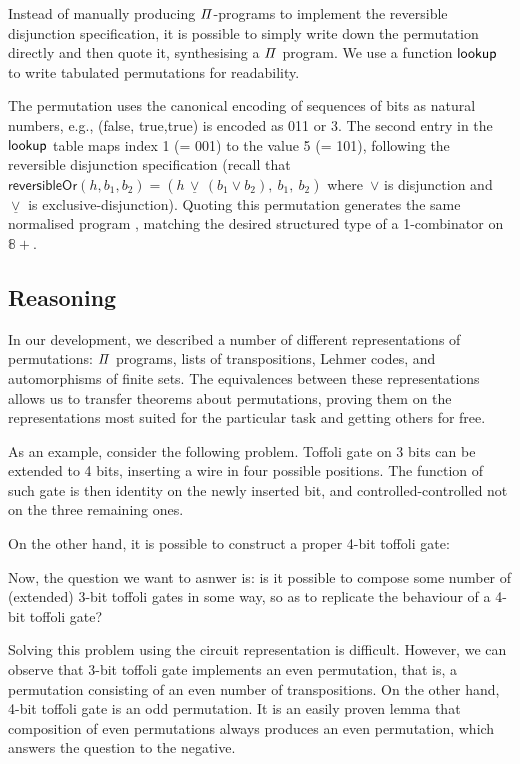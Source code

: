 Instead of manually producing $\mathit{\Pi}$-programs to implement the reversible disjunction specification, it is possible
to simply write down the permutation directly and then quote it, synthesising a $\mathit{\Pi}$ program. We use a function
$\operatorname{\mathsf{lookup}}$ to write tabulated permutations for readability.

\medskip
\resetperm{}

\noindent
The permutation uses the canonical encoding of sequences of bits as natural numbers, e.g., {(\textsf{false},
\textsf{true},\textsf{true})} is encoded as 011 or 3. The second entry in the $\operatorname{\mathsf{lookup}}$ table maps index 1 (= 001)
to the value 5 (= 101), following the reversible disjunction specification (recall that
$\mathsf{reversibleOr}(h,b_1,b_2) = (h \,\underline{\vee}\, (b_1 \vee b_2), ~b_1, ~b_2)$ where~$\vee$ is disjunction
and~$\underline{\vee}$ is exclusive-disjunction). Quoting this permutation generates the same normalised program
, matching the desired structured type of a 1-combinator on $\mathbb{8}+$.

\subsection{Reasoning}

In our development, we described a number of different representations of permutations: $\mathit{\Pi}$ programs, lists of
transpositions, Lehmer codes, and automorphisms of finite sets. The equivalences between these representations allows us
to transfer theorems about permutations, proving them on the representations most suited for the particular task and
getting others for free.

As an example, consider the following problem. Toffoli gate on 3 bits can be extended to 4 bits, inserting a wire in
four possible positions. The function of such gate is then identity on the newly inserted bit, and controlled-controlled
not on the three remaining ones. 

\medskip
{}

On the other hand, it is possible to construct a proper 4-bit toffoli gate:

\medskip
{}

Now, the question we want to asnwer is: is it possible to compose some number of (extended) 3-bit toffoli gates in some way, so as to replicate the
behaviour of a 4-bit toffoli gate?

Solving this problem using the circuit representation is difficult. However, we can observe that 3-bit toffoli gate
implements an even permutation, that is, a permutation consisting of an even number of transpositions. On the other
hand, 4-bit toffoli gate is an odd permutation. It is an easily proven lemma that composition of even permutations
always produces an even permutation, which answers the question to the negative.

